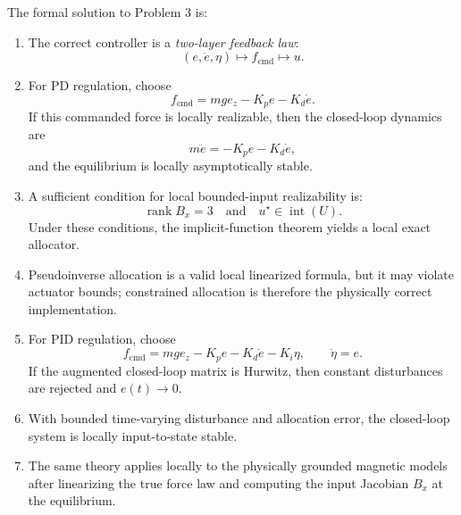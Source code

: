 \documentclass[11pt]{article}
\theoremstyle{definition}
\begin{document}
The formal solution to Problem 3 is:
\begin{enumerate}[label=\textbf{(\arabic*)}, leftmargin=1.5em]
    \item The correct controller is a \emph{two-layer feedback law}:
    \[
    (e,\dot e,\eta) \mapsto f_{\mathrm{cmd}} \mapsto u.
    \]

    \item For PD regulation, choose
    \[
    f_{\mathrm{cmd}} = mg e_z - K_p e - K_d \dot e.
    \]
    If this commanded force is locally realizable, then the closed-loop dynamics are
    \[
    m\ddot e = -K_p e - K_d \dot e,
    \]
    and the equilibrium is locally asymptotically stable.

    \item A sufficient condition for local bounded-input realizability is:
    \[
    \operatorname{rank} B_x = 3
    \quad \text{and} \quad
    u^\star \in \operatorname{int}(U).
    \]
    Under these conditions, the implicit-function theorem yields a local exact allocator.

    \item Pseudoinverse allocation is a valid local linearized formula, but it may violate actuator bounds; constrained allocation is therefore the physically correct implementation.

    \item For PID regulation, choose
    \[
    f_{\mathrm{cmd}} = mg e_z - K_p e - K_d \dot e - K_i \eta,
    \qquad
    \dot \eta = e.
    \]
    If the augmented closed-loop matrix is Hurwitz, then constant disturbances are rejected and $e(t) \to 0$.

    \item With bounded time-varying disturbance and allocation error, the closed-loop system is locally input-to-state stable.

    \item The same theory applies locally to the physically grounded magnetic models after linearizing the true force law and computing the input Jacobian $B_x$ at the equilibrium.
\end{enumerate}
\end{document}
